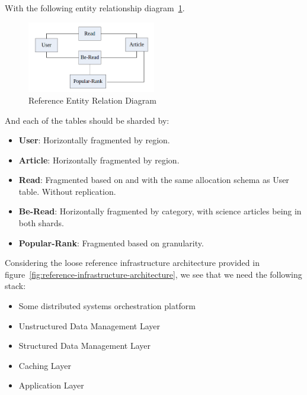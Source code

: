 \documentclass{report}
\begin{document}
    With the following entity relationship diagram~\ref{fig:reference-entity-relation-diagram}.

    \begin{figure}[h]
        \centering
        \includegraphics[width=0.5\textwidth]{images/reference-entity-relation-diagram}
        \caption{Reference Entity Relation Diagram}
        \label{fig:reference-entity-relation-diagram}
    \end{figure}

    And each of the tables should be sharded by:

    \begin{itemize}
        \item \textbf{User}: Horizontally fragmented by region.
        \item \textbf{Article}: Horizontally fragmented by region.
        \item \textbf{Read}: Fragmented based on and with the same allocation schema as User table. Without replication.
        \item \textbf{Be-Read}: Horizontally fragmented by category, with science articles being in both shards.
        \item \textbf{Popular-Rank}: Fragmented based on granularity.
    \end{itemize}

    Considering the loose reference infrastructure architecture provided in figure~\ref{fig:reference-infrastructure-architecture}, we see that we need the following stack:

    \begin{itemize}
        \item Some distributed systems orchestration platform
        \item Unstructured Data Management Layer
        \item Structured Data Management Layer
        \item Caching Layer
        \item Application Layer
    \end{itemize}
\end{document}
